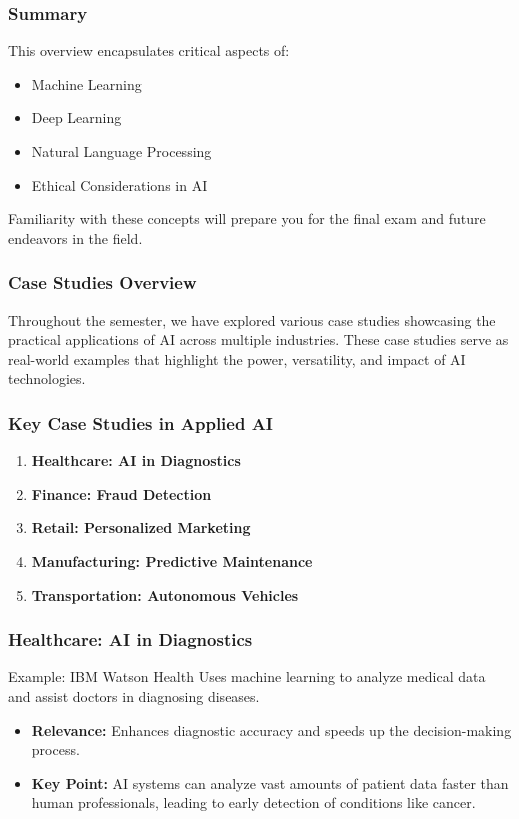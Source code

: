 \documentclass{beamer}
\begin{document}
\begin{frame}[fragile]
    \frametitle{Summary}
    This overview encapsulates critical aspects of:
    \begin{itemize}
        \item Machine Learning
        \item Deep Learning
        \item Natural Language Processing
        \item Ethical Considerations in AI
    \end{itemize}
    Familiarity with these concepts will prepare you for the final exam and future endeavors in the field.
\end{frame}

\begin{frame}[fragile]
    \frametitle{Case Studies Overview}
    Throughout the semester, we have explored various case studies showcasing the practical applications of AI across multiple industries. 
    These case studies serve as real-world examples that highlight the power, versatility, and impact of AI technologies.
\end{frame}

\begin{frame}[fragile]
    \frametitle{Key Case Studies in Applied AI}
    
    \begin{enumerate}
        \item \textbf{Healthcare: AI in Diagnostics}
        \item \textbf{Finance: Fraud Detection}
        \item \textbf{Retail: Personalized Marketing}
        \item \textbf{Manufacturing: Predictive Maintenance}
        \item \textbf{Transportation: Autonomous Vehicles}
    \end{enumerate}
\end{frame}

\begin{frame}[fragile]
    \frametitle{Healthcare: AI in Diagnostics}
    \begin{block}{Example: IBM Watson Health}
        Uses machine learning to analyze medical data and assist doctors in diagnosing diseases.
    \end{block}
    \begin{itemize}
        \item \textbf{Relevance:} Enhances diagnostic accuracy and speeds up the decision-making process.
        \item \textbf{Key Point:} AI systems can analyze vast amounts of patient data faster than human professionals, leading to early detection of conditions like cancer.
    \end{itemize}
\end{frame}
\end{document}
